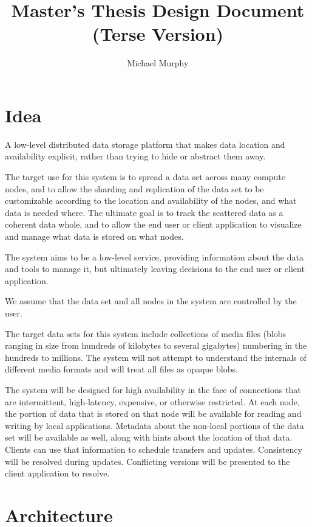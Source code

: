 \documentclass[a4paper]{article}
\begin{document}
\title{Master's Thesis Design Document \\ (Terse Version)}
\author{Michael Murphy}
\maketitle

\section{Idea}\label{idea}

A low-level distributed data storage platform that makes data location and
availability explicit, rather than trying to hide or abstract them away.

The target use for this system is to spread a data set across many compute
nodes, and to allow the sharding and replication of the data set to be
customizable according to the location and availability of the nodes, and what
data is needed where. The ultimate goal is to track the scattered data as a
coherent data whole, and to allow the end user or client application to
visualize and manage what data is stored on what nodes.

The system aims to be a low-level service, providing information about the data
and tools to manage it, but ultimately leaving decisions to the end user or
client application.

We assume that the data set and all nodes in the system are controlled by the
user.

The target data sets for this system include collections of media files (blobs
ranging in size from hundreds of kilobytes to several gigabytes) numbering in
the hundreds to millions. The system will not attempt to understand the
internals of different media formats and will treat all files as opaque blobs.

The system will be designed for high availability in the face of connections
that are intermittent, high-latency, expensive, or otherwise restricted. At each
node, the portion of data that is stored on that node will be available for
reading and writing by local applications. Metadata about the non-local portions
of the data set will be available as well, along with hints about the location
of that data. Clients can use that information to schedule transfers and
updates. Consistency will be resolved during updates. Conflicting versions will
be presented to the client application to resolve.


\section{Architecture}\label{architecture}
\end{document}
